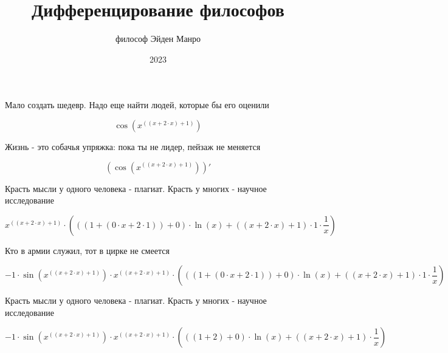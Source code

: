 \documentclass[a4paper,12pt]{article}
\title{\textbf{Дифференцирование философов}}
\author{философ Эйден Манро}
\date{2023}
\begin{document}
\maketitle
\begin{center}
Мало создать шедевр. Надо еще найти людей, которые бы его оценили
\end{center}


\begin{center}
\begin{equation}
\cos(x^{((x + 2 \cdot x) + 1)})
\end{equation}
\end{center}

\begin{center}
Жизнь - это собачья упряжка: пока ты не лидер, пейзаж не меняется
\end{center}


\begin{center}
\begin{equation}
(\cos(x^{((x + 2 \cdot x) + 1)}))'
\end{equation}
\end{center}

\begin{center}
Красть мысли у одного человека - плагиат. Красть у многих - научное исследование
\end{center}


\begin{center}
\begin{equation}
x^{((x + 2 \cdot x) + 1)} \cdot (((1 + (0 \cdot x + 2 \cdot 1)) + 0) \cdot \ln(x) + ((x + 2 \cdot x) + 1) \cdot 1 \cdot  \frac{1 }{ x } )
\end{equation}
\end{center}

\begin{center}
Кто в армии служил, тот в цирке не смеется
\end{center}


\begin{center}
\begin{equation}
-1 \cdot \sin(x^{((x + 2 \cdot x) + 1)}) \cdot x^{((x + 2 \cdot x) + 1)} \cdot (((1 + (0 \cdot x + 2 \cdot 1)) + 0) \cdot \ln(x) + ((x + 2 \cdot x) + 1) \cdot 1 \cdot  \frac{1 }{ x } )
\end{equation}
\end{center}

\begin{center}
Красть мысли у одного человека - плагиат. Красть у многих - научное исследование
\end{center}


\begin{center}
\begin{equation}
-1 \cdot \sin(x^{((x + 2 \cdot x) + 1)}) \cdot x^{((x + 2 \cdot x) + 1)} \cdot (((1 + 2) + 0) \cdot \ln(x) + ((x + 2 \cdot x) + 1) \cdot  \frac{1 }{ x } )
\end{equation}
\end{center}
\end{document}
